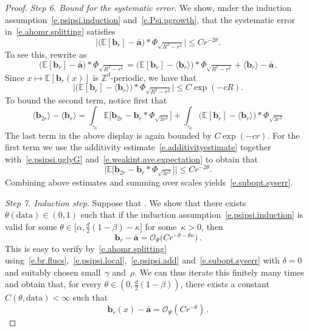 \documentclass[11pt]{article} %
\let\oldsquare\square %
\renewcommand{\square}{\oldsquare}
\numberwithin{equation}{section}
\theoremstyle{definition}
\newcommand*{\Z}{\ensuremath{\mathbb{Z}}}
\renewcommand{\b}{\ensuremath{\mathbf{b}}}
\renewcommand{\a}{\mathbf{a}}
\newcommand{\ahom}{\bar{\a}}
\newcommand{\cu}{\square}
\newcommand{\E}{\mathbb{E}}
\renewcommand{\O}{\mathcal{O}}
\newcommand{\data}{\mathrm{data}}
\begin{document}
\begin{proof}
\emph{Step 6. Bound for the systematic error}. We show, under the induction assumption~\eqref{e.psipsi.induction} and~\eqref{e.Psi.pgrowth},  that the systematic error in~\eqref{e.ahomr.splitting} satisfies
\begin{equation}  \label{e.subopt.syserr}
\Big| \bigl( \E [ \b_r ]- \ahom \bigr) \ast \Phi_{\sqrt{R^2-r^2}} \Big| \leq C r^{-2\theta}. 
\end{equation}
To see this, rewrite as
\begin{equation*}  
\bigl( \E [ \b_r ]- \ahom \bigr) \ast \Phi_{\sqrt{R^2-r^2}} 
=
\bigl( \E [ \b_r ] - \langle \b_r \rangle\bigr) \ast \Phi_{\sqrt{R^2-r^2}} 
+ 
\langle \b_r \rangle - \ahom 
\,.
\end{equation*}
Since $x \mapsto \E [ \b_r(x)]$ is $\Z^d$-periodic, we have that 
\begin{equation*}  
\Big| \bigl( \E [ \b_r ]- \langle\b_r\rangle \bigr) \ast \Phi_{\sqrt{R^2-r^2}} \Big| \leq C \exp(-c R) .
\end{equation*}
To bound the second term, notice first that 
\begin{equation*}  
\langle \b_{2r} \rangle - \langle \b_r \rangle  
=
\int_{\cu_0} \E\big[ \b_{2r}   - \b_r  \ast \Phi_{\sqrt{3 r^2}} \big]
+
\int_{\cu_0} \bigl( \E[\b_r]  - \langle \b_r\rangle \bigr) \ast \Phi_{\sqrt{3 r^2}} 
\end{equation*}
The last term in the above display is again bounded by $C \exp(-cr)$. For the first term we use the additivity estimate~\eqref{e.additivityestimate} together with~\eqref{e.psipsi.uglyG} and~\eqref{e.weakint.ave.expectation} to obtain that 
\begin{equation*}  
\Big| \E\big[ \b_{2r}   - \b_r  \ast \Phi_{\sqrt{3 r^2}} \big]\Big| \leq C r^{-2\theta} .
\end{equation*}
Combining above estimates and summing over scales yields~\eqref{e.subopt.syserr}. 

\smallskip 

\emph{Step 7. Induction step}. 
Suppose that .  We show that there exists $\theta(\data) \in (0,1)$ such that if the induction assumption~\eqref{e.psipsi.induction} is valid for some $\theta \in \Big[\alpha, \frac{d}{2}(1-\beta) - \kappa \Big]$ for some~$\kappa > 0$, then 
\begin{equation} \label{e.psipsi.buckling}
\b_r - \ahom 
=  
\O_{\Psi} 
\bigl(
C r^{- \theta - \theta \kappa} 
\bigr)
\,.
\end{equation}
This is easy to verify by~\eqref{e.ahomr.splitting} using~\eqref{e.br.flucs},~\eqref{e.psipsi.local},~\eqref{e.psipsi.add} and~\eqref{e.subopt.syserr} with $\delta = 0$ and suitably chosen small~$\gamma$ and~$\rho$.  We can thus iterate this finitely many times and obtain that, for every $\theta \in (0,\frac d2(1-\beta))$, there exists a constant~$C(\theta,\data)<\infty$ such that 
\begin{equation} \label{e.psipsi.nearlythere}
\b_r(x) - \ahom  = \O_{\Psi} ( C r^{-\theta} ) \,.
\end{equation} 


\end{proof}
\end{document}
